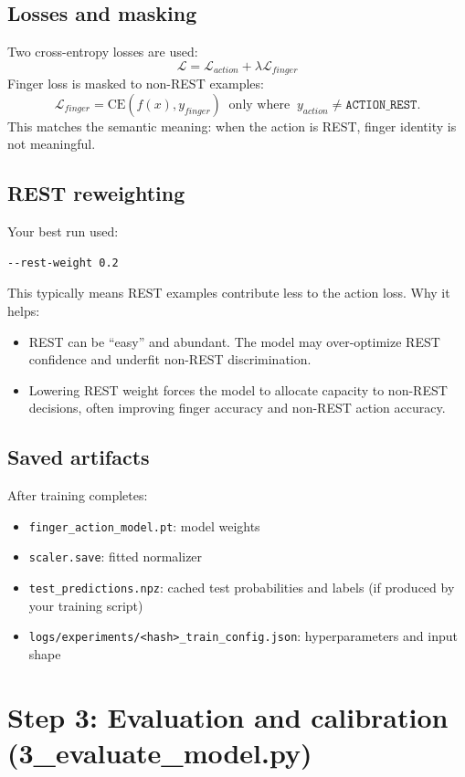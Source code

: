 \documentclass[11pt]{article}
\begin{document}
\subsection{Losses and masking}
Two cross-entropy losses are used:
\[
\mathcal{L} = \mathcal{L}_{action} + \lambda \mathcal{L}_{finger}
\]
Finger loss is masked to non-REST examples:
\[
\mathcal{L}_{finger} = \mathrm{CE}(f(x), y_{finger}) \;\;\text{only where}\;\; y_{action} \neq \texttt{ACTION\_REST}.
\]
This matches the semantic meaning: when the action is REST, finger identity is not meaningful.

\subsection{REST reweighting}
Your best run used:
\begin{lstlisting}
--rest-weight 0.2
\end{lstlisting}
This typically means REST examples contribute less to the action loss. Why it helps:
\begin{itemize}[leftmargin=*]
\item REST can be ``easy'' and abundant. The model may over-optimize REST confidence and underfit non-REST discrimination.
\item Lowering REST weight forces the model to allocate capacity to non-REST decisions, often improving finger accuracy and non-REST action accuracy.
\end{itemize}

\subsection{Saved artifacts}
After training completes:
\begin{itemize}[leftmargin=*]
\item \texttt{finger\_action\_model.pt}: model weights
\item \texttt{scaler.save}: fitted normalizer
\item \texttt{test\_predictions.npz}: cached test probabilities and labels (if produced by your training script)
\item \texttt{logs/experiments/<hash>\_train\_config.json}: hyperparameters and input shape
\end{itemize}

\section{Step 3: Evaluation and calibration (3\_evaluate\_model.py)}
\end{document}
